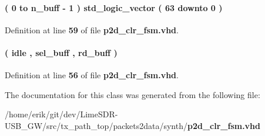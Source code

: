 \paragraph[{smpl\+\_\+nr\+\_\+array\+\_\+type}]{ {\bfseries \textcolor{vhdlchar}{(}\textcolor{vhdlchar}{ }\textcolor{vhdlchar}{ } \textcolor{vhdldigit}{0} \textcolor{vhdlchar}{ }\textcolor{keywordflow}{to}\textcolor{vhdlchar}{ }\textcolor{vhdlchar}{ }\textcolor{vhdlchar}{ }\textcolor{vhdlchar}{ }{\bfseries {\bf n\+\_\+buff}} \textcolor{vhdlchar}{-\/}\textcolor{vhdlchar}{ } \textcolor{vhdldigit}{1} \textcolor{vhdlchar}{ }\textcolor{vhdlchar}{)}\textcolor{vhdlchar}{ }\textcolor{vhdlchar}{ }\textcolor{comment}{std\+\_\+logic\+\_\+vector}\textcolor{vhdlchar}{ }\textcolor{vhdlchar}{(}\textcolor{vhdlchar}{ }\textcolor{vhdlchar}{ } \textcolor{vhdldigit}{63} \textcolor{vhdlchar}{ }\textcolor{keywordflow}{downto}\textcolor{vhdlchar}{ }\textcolor{vhdlchar}{ } \textcolor{vhdldigit}{0} \textcolor{vhdlchar}{ }\textcolor{vhdlchar}{)}\textcolor{vhdlchar}{ }} \hspace{0.3cm}{\ttfamily [Type]}}\label{classp2d__clr__fsm_1_1arch_aadc1ea405b09e325f52c3e7d8b3c1473}


Definition at line {\bf 59} of file {\bf p2d\+\_\+clr\+\_\+fsm.\+vhd}.

\paragraph[{state\+\_\+type}]{ {\bfseries \textcolor{vhdlchar}{(}\textcolor{vhdlchar}{ }\textcolor{vhdlchar}{idle}\textcolor{vhdlchar}{ }\textcolor{vhdlchar}{,}\textcolor{vhdlchar}{ }\textcolor{vhdlchar}{sel\+\_\+buff}\textcolor{vhdlchar}{ }\textcolor{vhdlchar}{,}\textcolor{vhdlchar}{ }\textcolor{vhdlchar}{rd\+\_\+buff}\textcolor{vhdlchar}{ }\textcolor{vhdlchar}{)}\textcolor{vhdlchar}{ }} \hspace{0.3cm}{\ttfamily [Type]}}\label{classp2d__clr__fsm_1_1arch_a6358909893b26920de1024de9c704239}


Definition at line {\bf 56} of file {\bf p2d\+\_\+clr\+\_\+fsm.\+vhd}.



The documentation for this class was generated from the following file\+:\begin{DoxyCompactItemize}
\item 
/home/erik/git/dev/\+Lime\+S\+D\+R-\/\+U\+S\+B\+\_\+\+G\+W/src/tx\+\_\+path\+\_\+top/packets2data/synth/{\bf p2d\+\_\+clr\+\_\+fsm.\+vhd}\end{DoxyCompactItemize}
